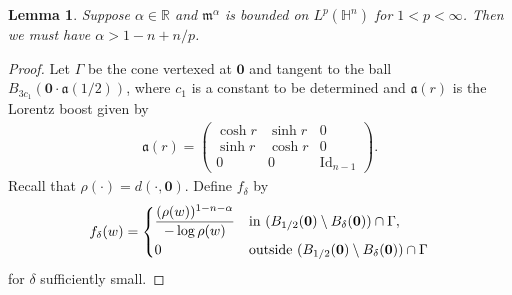\documentclass[11pt]{amsproc}
\newcommand{\R}{\mathbb{R}}
\newcommand{\Id}{\mathrm{Id}}
\newcommand{\fm}{\mathfrak{m}}
\newcommand{\0}{\mathbf{0}}
\newcommand{\fa}{\mathfrak{a}}
\renewcommand{\H}{\mathbb{H}}
\numberwithin{equation}{section}
\numberwithin{figure}{section}
\newtheorem{lem}[thm]{Lemma}
\theoremstyle{definition}
\theoremstyle{remark}
\numberwithin{thm}{section}
\begin{document}
\begin{lem}\label{le4.1}
Suppose $\alpha\in\R$ and $\fm^\alpha$ is bounded on $L^p(\H^n)$ for $1<p<\infty$.
Then we must have $\alpha>1-n+n/p$.
\end{lem}
\begin{proof}
Let $\Gamma$ be the cone vertexed at $\0$ and tangent to the ball $B_{3c_1}(\0\cdot \fa(1/2))$, where $c_1$ is a constant to be determined and $\fa(r)$ is the Lorentz boost given by
\begin{eqnarray*}
\fa(r)=\left(\begin{array}{ccc}
\cosh r & \sinh r & 0 \\
\sinh r & \cosh r & 0 \\
0 & 0 &\Id_{n-1}
\end{array}\right).
\end{eqnarray*}
Recall that $\rho(\cdot)=d(\cdot,\0)$. Define $f_\delta$ by
\begin{eqnarray*}
f_\delta(w)=
\begin{cases}
\displaystyle{(\rho(w))^{1-n-\alpha}\over -\log \rho(w)}&\mbox{in }(B_{1/2}(\0)\setminus B_\delta(\0))\cap \Gamma,\\[6pt]
0&\mbox{outside }(B_{1/2}(\0)\setminus B_\delta(\0))\cap\Gamma
\end{cases}
\end{eqnarray*}
for $\delta$ sufficiently small.


\end{proof}
\end{document}

